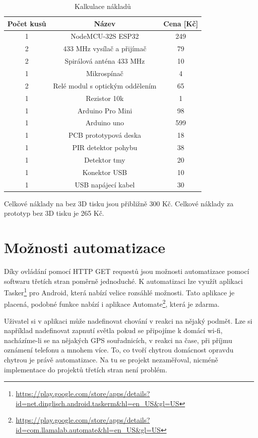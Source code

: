 \documentclass[11pt,a4paper,twoside,openright]{report}
\begin{document}
	\begin{table}[htb]
		\centering
		\begin{tabular}{|c|c|c|}
			\hline
			Počet kusů & Název & Cena [Kč] \\
			\hline
			1 & NodeMCU-32S ESP32 & 249  \\
			\hline
			2 & 433 MHz vysílač a přijímač & 79 \\
			\hline
			2 & Spirálová anténa 433 MHz & 10 \\
			\hline
			1 & Mikrospínač & 4 \\
			\hline
			2 & Relé modul s optickým oddělením & 65 \\
			\hline
			1 & Rezistor 10k & 1 \\
			\hline
			1 & Arduino Pro Mini & 98 \\
			\hline
			1 & Arduino uno & 599 \\
			\hline
			1 & PCB prototypová deska & 18 \\
			\hline
			1 & PIR detektor pohybu & 38 \\
			\hline
			1 & Detektor tmy & 20 \\
			\hline
			1 & Konektor USB & 10 \\
			\hline
			1 & USB napájecí kabel & 30 \\
			\hline
		\end{tabular}
		\caption{Kalkulace nákladů}
	\end{table}
	
	Celkové náklady na  bez 3D tisku jsou přibližně 300 Kč.
	Celkové náklady za prototyp  bez 3D tisku je 265 Kč.
	
	
	\section{Možnosti automatizace}
	Díky ovládání pomocí HTTP GET requestů jsou možnosti automatizace pomocí softwaru třetích stran poměrně jednoduché. K automatizaci lze využít aplikaci Tasker\footnote{\url{https://play.google.com/store/apps/details?id=net.dinglisch.android.taskerm&hl=en_US&gl=US}} pro Android, která nabízí velice rozsáhlé možnosti. Tato aplikace je placená, podobné funkce nabízí i aplikace Automate\footnote{\url{https://play.google.com/store/apps/details?id=com.llamalab.automate&hl=en_US&gl=US}}, která je zdarma. 
	
	
	Uživatel si v aplikaci může nadefinovat chování  v reakci na nějaký podmět. Lze si například nadefinovat zapnutí světla pokud se připojíme k domácí wi-fi, nacházíme-li se na nějakých GPS souřadnicích, v reakci na čase, při příjmu oznámení telefonu a mnohem více. To, co tvoří chytrou domácnost opravdu chytrou je právě automatizace. Na tu se projekt nezaměřoval, nicméně implementace do projektů třetích stran není problém.
	
\end{document}
